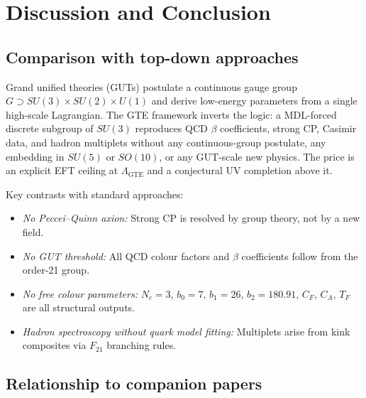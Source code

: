 \documentclass[11pt]{article}
\theoremstyle{remark}
\newcommand{\GTE}{\text{GTE}}
\newcommand{\Ftwentyone}{F_{21}}
\begin{document}
\section{Discussion and Conclusion}
\label{sec:discussion}

\subsection{Comparison with top-down approaches}
\label{ssec:compare}

Grand unified theories (GUTs) postulate a continuous gauge group $G \supset
SU(3) \times SU(2) \times U(1)$ and derive low-energy parameters from a
single high-scale Lagrangian.
The GTE framework inverts the logic: a MDL-forced discrete subgroup of $SU(3)$
reproduces QCD $\beta$ coefficients, strong CP, Casimir data, and hadron
multiplets without any continuous-group postulate, any embedding in $SU(5)$ or
$SO(10)$, or any GUT-scale new physics.
The price is an explicit EFT ceiling at $\Lambda_{\GTE}$ and a conjectural UV
completion above it.

Key contrasts with standard approaches:
\begin{itemize}[leftmargin=2em]
\item \textit{No Peccei--Quinn axion:} Strong CP is resolved by group theory,
  not by a new field.
\item \textit{No GUT threshold:} All QCD colour factors and $\beta$ coefficients
  follow from the order-21 group.
\item \textit{No free colour parameters:} $N_c = 3$, $b_0 = 7$, $b_1 = 26$,
  $b_2 = 180.91$, $C_F,\, C_A,\, T_F$ are all structural outputs.
\item \textit{Hadron spectroscopy without quark model fitting:} Multiplets
  arise from kink composites via $\Ftwentyone$ branching rules.
\end{itemize}

\subsection{Relationship to companion papers}
\label{ssec:crossref}
\end{document}
